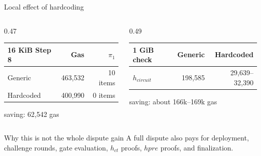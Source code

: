 \documentclass[aspectratio=169,10pt]{beamer}
\newcommand{\giB}{GiB}
\newcommand{\kib}{KiB}
\begin{document}
\begin{frame}{Local effect of hardcoding}
  \begin{columns}[T,onlytextwidth]
    \begin{column}{0.47\textwidth}
      \begin{center}
        \begin{tabular}{lrr}
          \toprule
          16 \kib{} Step 8 & Gas & \(\pi_1\) \\
          \midrule
          Generic & 463,532 & 10 items \\
          Hardcoded & 400,990 & 0 items \\
          \bottomrule
        \end{tabular}
      \end{center}
      \centering
      \textcolor{goodgreen}{saving: 62,542 gas}
    \end{column}
    \begin{column}{0.49\textwidth}
      \begin{center}
        \begin{tabular}{lrr}
          \toprule
          1 \giB{} check & Generic & Hardcoded \\
          \midrule
          \(h_{\mathit{circuit}}\) & 198,585 & 29,639--32,390 \\
          \bottomrule
        \end{tabular}
      \end{center}
      \centering
      \textcolor{goodgreen}{saving: about 166k--169k gas}
    \end{column}
  \end{columns}
  \vspace{0.8em}
  \begin{block}{Why this is not the whole dispute gain}
    A full dispute also pays for deployment, challenge rounds, gate evaluation,
    \(h_{\mathit{ct}}\) proofs, \(hpre\) proofs, and finalization.
  \end{block}
\end{frame}
\end{document}
